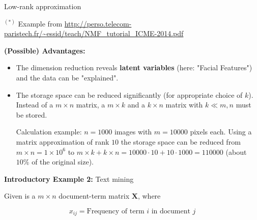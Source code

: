 \documentclass[11pt,compress,t,notes=noshow, xcolor=table]{beamer}
\begin{document}
\begin{vbframe}{Low-rank approximation}
\vfill
\begin{footnotesize}
$^{(*)}$ Example from \url{http://perso.telecom-paristech.fr/~essid/teach/NMF_tutorial_ICME-2014.pdf}
\end{footnotesize}

\framebreak

\textbf{(Possible) Advantages: }
\begin{itemize}
\item The dimension reduction reveals \textbf{latent variables} (here: "Facial Features") and the data can be "explained".
\item The storage space can be reduced significantly (for appropriate choice of $k$). Instead of a $m \times n$ matrix, a $m \times k$ and a $k \times n$ matrix with $k \ll m, n$ must be stored. \\
\begin{footnotesize}
\vspace*{0.2cm}
Calculation example: $n = 1000$ images with $m = 10000$ pixels each. Using a matrix approximation of rank $10$ the storage space can be reduced from $m \times n = 1 \times 10^6$ to $m \times k + k \times n = 10000 \cdot 10 + 10 \cdot 1000 = 110000$ (about $10\%$ of the original size).
\end{footnotesize}
\vspace*{0.2cm}
\end{itemize}




\framebreak

\textbf{Introductory Example 2:} Text mining

\lz

Given is a $m \times n$ document-term matrix $\mathbf{X}$, where

$$
x_{ij} = \text{Frequency of term $i$ in document $j$}
$$


\end{vbframe}
\end{document}

